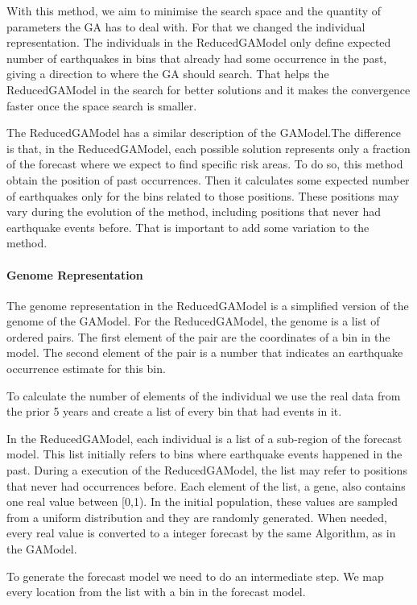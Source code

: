 With this method, we aim to minimise the search space and the quantity of parameters the GA has to deal with. For that we changed the individual representation. The individuals in the ReducedGAModel only define expected number of earthquakes in bins that already had some occurrence in the past, giving a direction to where the GA should search. That helps the ReducedGAModel in the search for better solutions and it makes the convergence faster once the space search is smaller.

The ReducedGAModel has a similar description of the GAModel.The difference is that, in the ReducedGAModel, each possible solution represents only a fraction of the forecast where we expect to find specific risk areas. To do so, this method obtain the position of past occurrences. Then it calculates some expected number of earthquakes only for the bins related to those positions. These positions may vary during the evolution of the method, including positions that never had earthquake events before. That is important to add some variation to the method.


\paragraph{Genome Representation}\label{genomeReduced}
The genome representation in the ReducedGAModel is a simplified version of the genome of the GAModel. For the ReducedGAModel, the genome is a list of ordered pairs. The first element of the pair are the coordinates of a bin in the model. The second element of the pair is a number that indicates an earthquake occurrence estimate for this bin.

To calculate the number of elements of the individual we use the real data from the prior 5 years and create a list of every bin that had events in it.

In the ReducedGAModel, each individual is a list of a sub-region of the forecast model. This list initially refers to bins where earthquake events happened in the past. During a execution of the ReducedGAModel, the list may refer to positions that never had occurrences before. Each element of the list, a gene, also contains one real value between [0,1). In the initial population, these values are sampled from a uniform distribution and they are randomly generated. When needed, every real value is converted to a integer forecast by the same Algorithm, as in the GAModel.

To generate the forecast model we need to do an intermediate step. We map every location from the list with a bin in the forecast model.

